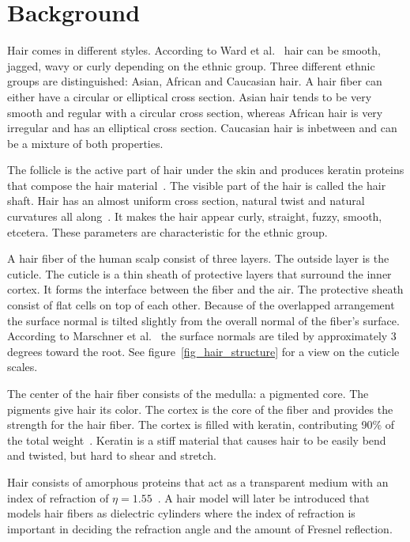 \documentclass[11pt,a4paper]{report}
\begin{document}
\chapter{Background}

Hair comes in different styles. According to Ward et al.~\cite{ward} hair can be smooth, jagged, wavy or curly depending on the ethnic group. Three different ethnic groups are distinguished: Asian, African and Caucasian hair. A hair fiber can either have a circular or elliptical cross section. Asian hair tends to be very smooth and regular with a circular cross section, whereas African hair is very irregular and has an elliptical cross section. Caucasian hair is inbetween and can be a mixture of both properties.

The follicle is the active part of hair under the skin and produces keratin proteins that compose the hair material~\cite{hadap}. The visible part of the hair is called the hair shaft. Hair has an almost uniform cross section, natural twist and natural curvatures all along~\cite{hadap}. It makes the hair appear curly, straight, fuzzy, smooth, etcetera. These parameters are characteristic for the ethnic group.

A hair fiber of the human scalp consist of three layers. The outside layer is the cuticle. The cuticle is a thin sheath of protective layers that surround the inner cortex. It forms the interface between the fiber and the air. The protective sheath consist of flat cells on top of each other. Because of the overlapped arrangement the surface normal is tilted slightly from the overall normal of the fiber's surface. According to Marschner et al.~\cite{marschner} the surface normals are tiled by approximately 3 degrees toward the root. See figure~\ref{fig_hair_structure} for a view on the cuticle scales.

The center of the hair fiber consists of the medulla: a pigmented core. The pigments give hair its color. The cortex is the core of the fiber and provides the strength for the hair fiber. The cortex is filled with keratin, contributing 90\% of the total weight~\cite{ward}. Keratin is a stiff material that causes hair to be easily bend and twisted, but hard to shear and stretch.

Hair consists of amorphous proteins that act as a transparent medium with an index of refraction of $\eta = 1.55$~\cite{ward}. A hair model will later be introduced that models hair fibers as dielectric cylinders where the index of refraction is important in deciding the refraction angle and the amount of Fresnel reflection.
\end{document}
